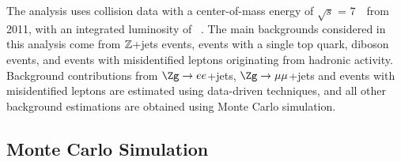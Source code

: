 
The analysis uses collision data with a center-of-mass energy of
$\sqrt{s}$ = 7~\TeV\ from 2011, with an integrated luminosity
of \lumitotpm~\cite{lumiPub, lumi}.
The main backgrounds considered in this analysis come from
$\mathbb{Z}$+jets events, events with a single top quark,
diboson events, and events with misidentified leptons originating from hadronic activity.
Background contributions from
$\Zg\rightarrow ee$+jets, $\Zg\rightarrow\mu\mu$+jets and events with
misidentified leptons are estimated using data-driven techniques, and all
other background estimations are obtained using Monte Carlo simulation.




\subsection{Monte Carlo Simulation}
\label{s:mc}


